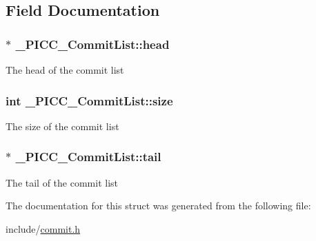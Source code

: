 \subsection{Field Documentation}
\hypertarget{struct__PICC__CommitList_a1e6220d188b828adf2e1833e638196b3}{
\subsubsection[{head}]{$\ast$ \-\_\-\-P\-I\-C\-C\-\_\-\-Commit\-List\-::head}}\label{struct__PICC__CommitList_a1e6220d188b828adf2e1833e638196b3}
The head of the commit list \hypertarget{struct__PICC__CommitList_a5eb47c6882e4462d638224d54686f7e0}{
\subsubsection[{size}]{\setlength{\rightskip}{0pt plus 5cm}int \-\_\-\-P\-I\-C\-C\-\_\-\-Commit\-List\-::size}}\label{struct__PICC__CommitList_a5eb47c6882e4462d638224d54686f7e0}
The size of the commit list \hypertarget{struct__PICC__CommitList_ace35f17402f08d1ea9e8fa45c6f7f562}{
\subsubsection[{tail}]{$\ast$ \-\_\-\-P\-I\-C\-C\-\_\-\-Commit\-List\-::tail}}\label{struct__PICC__CommitList_ace35f17402f08d1ea9e8fa45c6f7f562}
The tail of the commit list 

The documentation for this struct was generated from the following file\-:\begin{DoxyCompactItemize}
\item 
include/\hyperlink{commit_8h}{commit.\-h}\end{DoxyCompactItemize}
